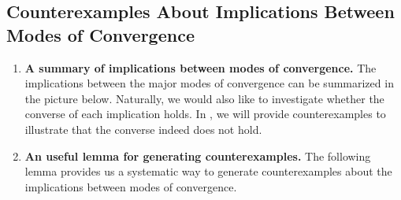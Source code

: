 \subsection{Counterexamples About Implications Between Modes of Convergence}
\label{subsect:counterexamples}
\begin{enumerate}
\item \textbf{A summary of implications between modes of convergence.}
The implications between the major modes of convergence can be
summarized in the picture below. Naturally, we would also like to investigate
whether the converse of each implication holds. In
, we will provide counterexamples to illustrate
that the converse indeed does not hold.
\begin{center}
\end{center}
\item \textbf{An useful lemma for generating counterexamples.} The following
lemma provides us a systematic way to generate counterexamples about the
implications between modes of convergence.


\end{enumerate}

